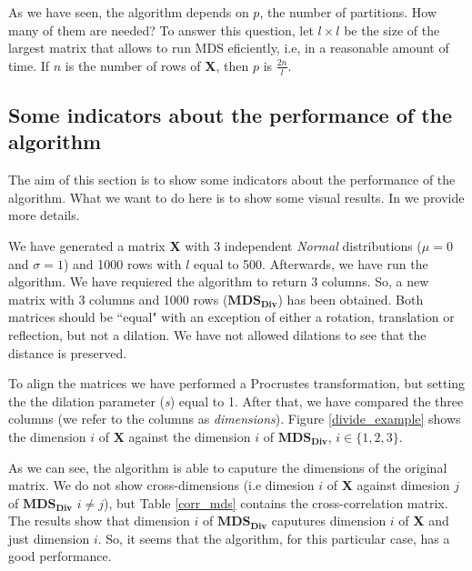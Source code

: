 \documentclass[11pt]{report}
\begin{document}
As we have seen, the algorithm depends on $p$, the number of partitions. How 
many of them are needed? To answer this question, let $l \times l$ be the 
size of the largest matrix that allows to run MDS eficiently, i.e, in a 
reasonable amount of time. If $n$ is the number of rows 
of \textbf{X}, then $p$ is $\frac{2n}{l}$. 

\subsection{Some indicators about the performance of the algorithm}
\label{chap:ind_div}
The aim of this section is to show some indicators about the performance of the
algorithm. What we want to do here is to show some visual results. In 
 we provide more details.

\indent We have generated a matrix \textbf{X} with 3 independent \textit{Normal} 
distributions ($\mu = 0$ and $\sigma = 1$) and 1000 rows with $l$ equal to 500. 
Afterwards, we have run the algorithm. We have requiered the algorithm to 
return 3 columns. So, a new matrix with 3 columns and 1000 rows 
($\mathbf{MDS_{Div}}$) has been obtained. Both matrices should be ``equal" 
with an exception of either a rotation, translation or reflection, but 
not a dilation. We have not allowed dilations to see that the distance is 
preserved.

\indent To align the matrices we have performed a Procrustes transformation, but 
setting the the dilation parameter (\textit{s}) equal to 1. 
After that, we have compared the three columns (we refer to the columns as 
\textit{dimensions}). Figure \ref{divide_example} shows the dimension
$i$ of \textbf{X} against the dimension $i$ of $\mathbf{MDS_{Div}}$, 
$i \in \{1,2,3\}$. 

\indent As we can see, the algorithm is able to caputure the dimensions of the 
original matrix. We do not show cross-dimensions (i.e dimesion $i$ of \textbf{X}
against dimesion $j$ of $\mathbf{MDS_{Div}}$ $ i \neq j$), but Table 
\ref{corr_mds} contains the cross-correlation matrix. The results 
show that dimension  $i$ of  $\mathbf{MDS_{Div}}$ caputures dimension 
$i$ of \textbf{X} and just dimension $i$. So, it seems that the algorithm, for 
this particular case, has a good performance.
\end{document}
